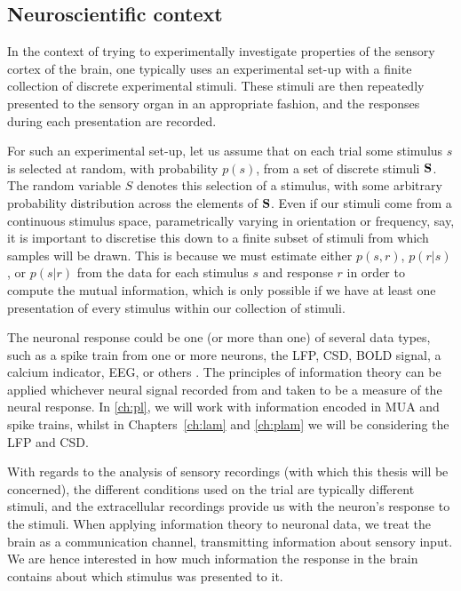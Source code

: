 \subsection{Neuroscientific context}

In the context of trying to experimentally investigate properties of the sensory cortex of the brain, one typically uses an experimental set-up with a finite collection of discrete experimental stimuli.
These stimuli are then repeatedly presented to the sensory organ in an appropriate fashion, and the responses during each presentation are recorded.

For such an experimental set-up, let us assume that on each trial some stimulus $s$ is selected at random, with probability $p(s)$, from a set of discrete stimuli $\mathbf{S}$.
The random variable $S$ denotes this selection of a stimulus, with some arbitrary probability distribution across the elements of $\mathbf{S}$.
Even if our stimuli come from a continuous stimulus space, parametrically varying in orientation or frequency, say, it is important to discretise this down to a finite subset of stimuli from which samples will be drawn.
This is because we must estimate either $p(s,r)$, $p(r|s)$, or $p(s|r)$ from the data for each stimulus $s$ and response $r$ in order to compute the mutual information, which is only possible if we have at least one presentation of every stimulus within our collection of stimuli.

The neuronal response could be one (or more than one) of several data types, such as a spike train from one or more neurons, the \ac{LFP}, \ac{CSD}, \ac{BOLD} signal, a calcium indicator, \ac{EEG}, or others \citep{Magri2009,Quiroga2009}.
The principles of information theory can be applied whichever neural signal recorded from and taken to be a measure of the neural response.
In \autoref{ch:pl}, we will work with information encoded in \ac{MUA} and spike trains, whilst in Chapters~\ref{ch:lam} and \ref{ch:plam} we will be considering the \ac{LFP} and \ac{CSD}.

With regards to the analysis of sensory recordings (with which this thesis will be concerned), the different conditions used on the trial are typically different stimuli, and the extracellular recordings provide us with the neuron's response to the stimuli.
When applying information theory to neuronal data, we treat the brain as a communication channel, transmitting information about sensory input.
We are hence interested in how much information the response in the brain contains about which stimulus was presented to it.


